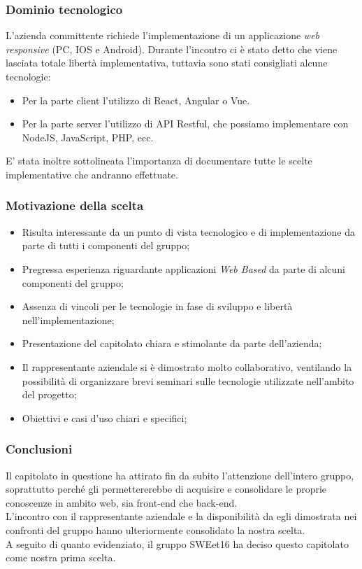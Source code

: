 \documentclass[a4paper, 11pt]{article}
\begin{document}
\subsubsection{Dominio tecnologico}
L'azienda committente richiede l'implementazione di un applicazione \textit{web responsive} (PC, IOS e Android).
Durante l'incontro ci è stato detto che viene lasciata totale libertà implementativa, tuttavia sono stati consigliati alcune tecnologie:
\begin{itemize}
    \item Per la parte client l'utilizzo di React, Angular o Vue.
    \item Per la parte server l'utilizzo di API Restful, che possiamo implementare con NodeJS, JavaScript, PHP, ecc.
\end{itemize}
E' stata inoltre sottolineata l'importanza di documentare tutte le scelte implementative che andranno effettuate.

\pagebreak

\subsubsection{Motivazione della scelta}
\begin{itemize}
    \item Risulta interessante da un punto di vista tecnologico e di implementazione da parte di tutti i componenti del gruppo;
    \item Pregressa esperienza riguardante applicazioni \textit{Web Based} da parte di alcuni componenti del gruppo;
    \item Assenza di vincoli per le tecnologie in fase di sviluppo e libertà nell'implementazione;
    \item Presentazione del capitolato chiara e stimolante da parte dell'azienda;
    \item Il rappresentante aziendale si è dimostrato molto collaborativo, ventilando la possibilità di organizzare brevi seminari sulle tecnologie utilizzate nell'ambito del progetto;
    \item Obiettivi e casi d'uso chiari e specifici;
\end{itemize}

\subsubsection{Conclusioni}
Il capitolato in questione ha attirato fin da subito l'attenzione dell'intero gruppo, soprattutto perché gli permettererebbe  di acquisire e consolidare le proprie conoscenze in ambito web, sia front-end che back-end. \\
L'incontro con il rappresentante aziendale e la disponibilità da egli dimostrata nei confronti del gruppo hanno ulteriormente consolidato la nostra scelta. \\ 
A seguito di quanto evidenziato, il gruppo SWEet16 ha deciso questo capitolato come nostra prima scelta.
\end{document}
